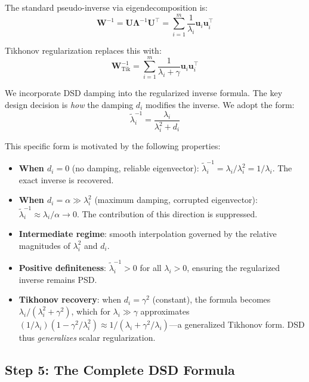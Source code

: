 \documentclass[journal]{IEEEtran}
\begin{document}
The standard pseudo-inverse via eigendecomposition is:
\begin{equation}
\bm{W}^{-1} = \bm{U}\bm{\Lambda}^{-1}\bm{U}^\top = \sum_{i=1}^m \frac{1}{\lambda_i} \bm{u}_i \bm{u}_i^\top
\end{equation}

Tikhonov regularization replaces this with:
\begin{equation}
\bm{W}_{\text{Tik}}^{-1} = \sum_{i=1}^m \frac{1}{\lambda_i + \gamma} \bm{u}_i \bm{u}_i^\top
\label{eq:tikhonov_eigen}
\end{equation}

We incorporate DSD damping into the regularized inverse formula. The key design decision is \emph{how} the damping $d_i$ modifies the inverse. We adopt the form:
\begin{equation}
\tilde{\lambda}_i^{-1} = \frac{\lambda_i}{\lambda_i^2 + d_i}
\label{eq:dsd_formula_derived}
\end{equation}

This specific form is motivated by the following properties:

\begin{itemize}
\item \textbf{When $d_i = 0$} (no damping, reliable eigenvector): $\tilde{\lambda}_i^{-1} = \lambda_i / \lambda_i^2 = 1/\lambda_i$. The exact inverse is recovered.
\item \textbf{When $d_i = \alpha \gg \lambda_i^2$} (maximum damping, corrupted eigenvector): $\tilde{\lambda}_i^{-1} \approx \lambda_i / \alpha \to 0$. The contribution of this direction is suppressed.
\item \textbf{Intermediate regime}: smooth interpolation governed by the relative magnitudes of $\lambda_i^2$ and $d_i$.
\item \textbf{Positive definiteness}: $\tilde{\lambda}_i^{-1} > 0$ for all $\lambda_i > 0$, ensuring the regularized inverse remains PSD.
\item \textbf{Tikhonov recovery}: when $d_i = \gamma^2$ (constant), the formula becomes $\lambda_i/(\lambda_i^2 + \gamma^2)$, which for $\lambda_i \gg \gamma$ approximates $(1/\lambda_i)(1 - \gamma^2/\lambda_i^2) \approx 1/(\lambda_i + \gamma^2/\lambda_i)$---a generalized Tikhonov form. DSD thus \emph{generalizes} scalar regularization.
\end{itemize}

\subsection{Step 5: The Complete DSD Formula}
\end{document}
